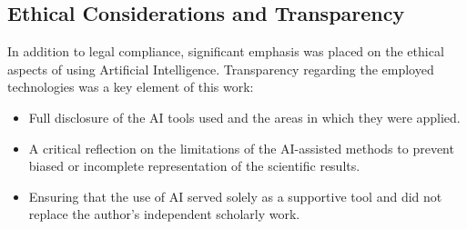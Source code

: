 \subsection*{Ethical Considerations and Transparency}
In addition to legal compliance, significant emphasis was placed on the ethical aspects of using Artificial Intelligence. Transparency regarding the employed technologies was a key element of this work:
\begin{itemize}
    \item Full disclosure of the AI tools used and the areas in which they were applied.
    \item A critical reflection on the limitations of the AI-assisted methods to prevent biased or incomplete representation of the scientific results.
    \item Ensuring that the use of AI served solely as a supportive tool and did not replace the author’s independent scholarly work.
\end{itemize}
